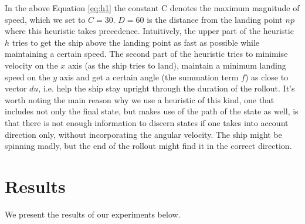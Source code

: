 \documentclass[conference]{IEEEtran}
\begin{document}
In the above Equation \ref{eq:h1} the constant C denotes the maximum magnitude of speed, which we set to $C=30$. $D = 60$ is the distance from the landing point $np$ where this heuristic takes precedence.  Intuitively, the upper part of the heuristic $h$ tries to get the ship above the landing point as fast as possible while maintaining a certain speed. The second part of the heuristic tries to minimise velocity on the $x$ axis (as the ship tries to land), maintain a minimum landing speed on the $y$ axis and get a certain angle (the summation term $f$) as close to vector $du$, i.e. help the ship stay upright through the duration of the rollout.  It's worth noting the main reason why we use a heuristic of this kind, one that includes not only the final state, but makes use of the path of the state as well, is that there is not enough information to discern states if one takes into account direction only, without incorporating the angular velocity. The ship might be spinning madly, but the end of the rollout might find it in the correct direction. 

\section{Results} \label{sec:Experiments}
We present the results of our experiments below.








       

\end{document}
